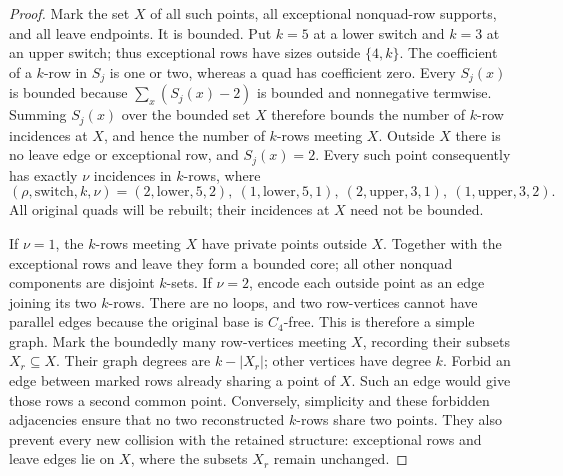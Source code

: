 \documentclass[11pt]{article}
\begin{document}
\begin{proof}
Mark the set $X$ of all such points, all exceptional nonquad-row
supports, and all leave endpoints. It is bounded. Put $k=5$ at a lower
switch and $k=3$ at an upper switch; thus exceptional rows have sizes
outside $\{4,k\}$. The coefficient of a $k$-row in
$S_j$ is one or two, whereas a quad has coefficient zero. Every $S_j(x)$
is bounded because $\sum_x(S_j(x)-2)$ is bounded and nonnegative termwise.
Summing $S_j(x)$ over the bounded set $X$ therefore bounds the number of
$k$-row incidences at $X$, and hence the number of $k$-rows meeting $X$.
Outside $X$ there is no leave edge or exceptional row, and $S_j(x)=2$.
Every such point consequently has exactly
$\nu$ incidences in $k$-rows, where
\[
 (\rho,\text{switch},k,\nu)
 =(2,\text{lower},5,2),\ (1,\text{lower},5,1),\
 (2,\text{upper},3,1),\ (1,\text{upper},3,2).
\]
All original quads will be rebuilt; their incidences at $X$ need not be
bounded.

If $\nu=1$, the $k$-rows meeting $X$ have private points outside $X$.
Together with the exceptional rows and leave they form a bounded core;
all other nonquad components are disjoint $k$-sets.
If $\nu=2$, encode each outside point as an edge joining its two
$k$-rows. There are no loops, and two row-vertices cannot have parallel
edges because the original base is $C_4$-free. This is therefore a simple
graph. Mark the boundedly many row-vertices
meeting $X$, recording their subsets $X_r\subseteq X$.
Their graph degrees are $k-|X_r|$; other vertices have degree $k$.
Forbid an edge between marked rows already sharing a point of $X$.
Such an edge would give those rows a second common point. Conversely,
simplicity and these forbidden adjacencies ensure that no two reconstructed
$k$-rows share two points. They also prevent every new collision with
the retained structure: exceptional rows and leave edges lie on $X$,
where the subsets $X_r$ remain unchanged.


\end{proof}
\end{document}
